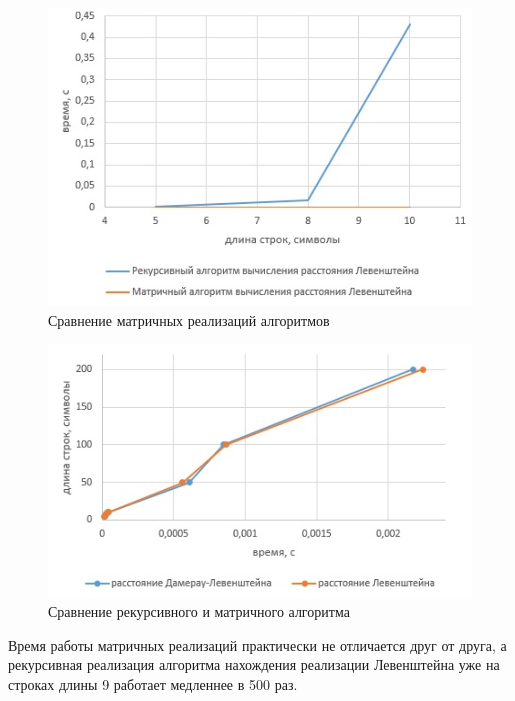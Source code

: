 \documentclass[a4paper,12pt]{article}
\begin{document}
	\begin{center}
	\begin{figure}[h]	
        				{
        					\centering
        					\includegraphics[scale=0.7]{t1.jpg}
        					\caption{Сравнение матричных реализаций алгоритмов}
        					\label{ris:cmp_mtrx}
        				}
        			\end{figure}
        		
        			\begin{figure}[h]	
        				{
        					\centering
        					\includegraphics[scale=0.7]{t2.jpg}
        					\caption{\label{ris:cmp_r_and_m}Сравнение рекурсивного и матричного алгоритма}        					
        				}
        			\end{figure}
	\end{center}
	\newpage
	Время работы матричных реализаций практически не отличается друг от друга, а рекурсивная реализация алгоритма нахождения реализации Левенштейна уже на строках длины 9 работает медленнее в 500 раз.
\end{document}
